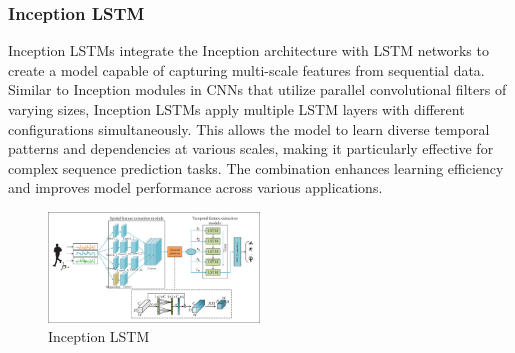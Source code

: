 \documentclass[nonacm,sigconf]{acmart}
\begin{document}
\subsubsection{\textbf{Inception LSTM}}
Inception LSTMs integrate the Inception architecture with LSTM networks to create a model capable of capturing multi-scale features from sequential data. Similar to Inception modules in CNNs that utilize parallel convolutional filters of varying sizes, Inception LSTMs apply multiple LSTM layers with different configurations simultaneously. This allows the model to learn diverse temporal patterns and dependencies at various scales, making it particularly effective for complex sequence prediction tasks. The combination enhances learning efficiency and improves model performance across various applications.
\begin{figure}[h]
  \centering
  \includegraphics[width=0.5\textwidth]{LSTMs/inception.png}
  \caption{Inception LSTM}
\end{figure}
\end{document}
